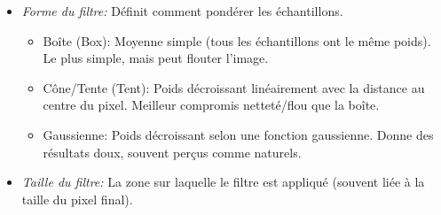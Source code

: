 \documentclass{article}
\begin{document}
\begin{itemize}
        \begin{itemize}
            \item \textit{Forme du filtre:} Définit comment pondérer les échantillons.
                \begin{itemize}
                    \item Boîte (Box): Moyenne simple (tous les échantillons ont le même poids). Le plus simple, mais peut flouter l'image.
                    \item Cône/Tente (Tent): Poids décroissant linéairement avec la distance au centre du pixel. Meilleur compromis netteté/flou que la boîte.
                    \item Gaussienne: Poids décroissant selon une fonction gaussienne. Donne des résultats doux, souvent perçus comme naturels.
                \end{itemize}
            \item \textit{Taille du filtre:} La zone sur laquelle le filtre est appliqué (souvent liée à la taille du pixel final).
        \end{itemize}
\end{itemize}
\end{document}
